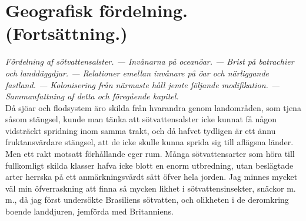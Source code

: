 




\chapter[Geografisk fördelning II]{Geografisk fördelning. \\ (Fortsättning.) }

{\it
Fördelning af sötvattensalster. — Invånarna på oceanöar. — Brist på batrachier och landdäggdjur. — Relationer emellan invånare på öar och närliggande fastland. — Kolonisering från närmaste håll jemte följande modifikation. — Sammanfattning af detta och föregående kapitel.
}\\[0.5cm]

Då sjöar och flodsystem äro skilda från hvarandra genom landområden, som tjena såsom stängsel, kunde man tänka att sötvattensalster icke kunnat få någon vidsträckt spridning inom samma trakt, och då hafvet tydligen är ett ännu fruktansvärdare stängsel, att de icke skulle kunna sprida sig till aflägsna länder. Men ett rakt motsatt förhållande eger rum. Många sötvattensarter som höra till fullkomligt skilda klasser hafva icke blott en enorm utbredning, utan beslägtade arter herrska på ett anmärkningsvärdt sätt öfver hela jorden. Jag minnes mycket väl min öfverraskning att finna så mycken likhet i sötvattensinsekter, snäckor m. m., då jag först undersökte Brasiliens sötvatten, och olikheten i de deromkring boende landdjuren, jemförda med Britanniens.

